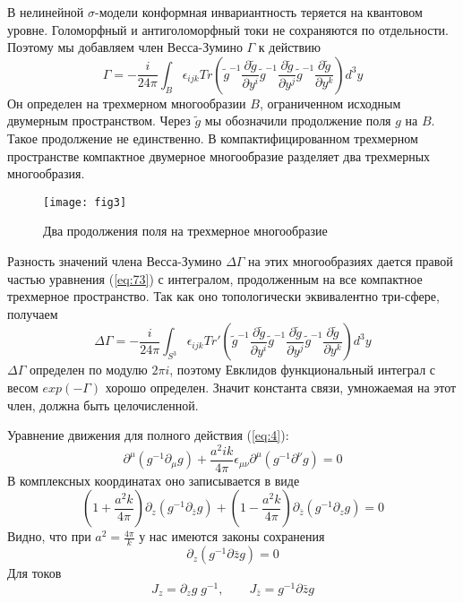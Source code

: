 В нелинейной $\sigma$-модели конформная инвариантность теряется на квантовом уровне.
Голоморфный и антиголоморфный токи не сохраняются по отдельности.
Поэтому мы добавляем член Весса-Зумино $\Gamma$ к действию
\begin{equation}
  \label{eq:73}
\Gamma= - \frac{i }{24\pi} \int_{B}\epsilon_{ijk} Tr\left(
    \tilde g^{-1}\frac{\partial \tilde g}{\partial y^i}
      \tilde g^{-1}\frac{\partial \tilde g}{\partial y^j}
      \tilde g^{-1}\frac{\partial \tilde g}{\partial y^k}\right) d^3y
\end{equation}
Он определен на трехмерном многообразии $B$, ограниченном исходным двумерным пространством.
Через $\tilde{g}$ мы обозначили продолжение поля $g$ на $B$. Такое продолжение не единственно. В
компактифицированном трехмерном пространстве компактное двумерное многообразие разделяет два
трехмерных многообразия.
\begin{figure}[h]
 \centering
  \texttt{[image: fig3]}  
  \caption{Два продолжения поля на трехмерное многообразие}
  \label{fig:1}
\end{figure}

Разность значений члена Весса-Зумино $\Delta\Gamma$ на этих многообразиях
дается правой частью уравнения (\ref{eq:73}) с интегралом, продолженным на все компактное трехмерное
пространство. Так как оно топологически эквивалентно три-сфере, получаем
\begin{equation}
  \label{eq:75} \Delta\Gamma= - \frac{i }{24\pi} \int_{S^3}\epsilon_{ijk} Tr'\left( \tilde
g^{-1}\frac{\partial \tilde g}{\partial y^i} \tilde g^{-1}\frac{\partial \tilde g}{\partial y^j}
\tilde g^{-1}\frac{\partial \tilde g}{\partial y^k}\right) d^3y
\end{equation}
$\Delta\Gamma$ определен по модулю $2\pi i$, поэтому Евклидов функциональный интеграл
с весом $exp(-\Gamma)$ хорошо определен. Значит константа связи, умножаемая на этот член, должна
быть целочисленной.

Уравнение движения для полного действия (\ref{eq:4}):
\begin{equation}
  \label{eq:77}
  \partial^{\mu}(g^{-1}\partial_{\mu}g)+\frac{a^2 ik}{4\pi}\epsilon_{\mu\nu}\partial^{\mu}(g^{-1}\partial^{\nu}g)=0
\end{equation}
В комплексных координатах оно записывается в виде
\begin{equation}
  \label{eq:78}
  (1+\frac{a^2 k}{4\pi})\partial_z(g^{-1}\partial_{\bar z}g)+(1-\frac{a^2 k}{4\pi})\partial_{\bar z}(g^{-1}\partial_z g)=0
\end{equation}
Видно, что при $a^2=\frac{4\pi}{k}$ у нас имеются законы сохранения
\begin{equation}
  \label{eq:79}
  \partial_z(g^{-1}\partial{\bar z}g)=0
\end{equation}
Для токов
\begin{equation}
  \label{eq:72}
  J_z=\partial_z g\;g^{-1}, \qquad J_{\bar{z}}=g^{-1}\partial{\bar z}g
\end{equation}

